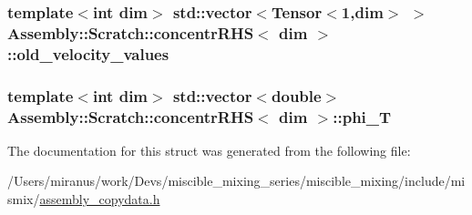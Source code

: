 \subsubsection[{old\+\_\+velocity\+\_\+values}]{\setlength{\rightskip}{0pt plus 5cm}template$<$int dim$>$ std\+::vector$<$Tensor$<$1,dim$>$ $>$ {\bf Assembly\+::\+Scratch\+::concentr\+R\+H\+S}$<$ dim $>$\+::old\+\_\+velocity\+\_\+values}\label{struct_assembly_1_1_scratch_1_1concentr_r_h_s_a387df4b1d77c791fa36096d021da90b0}
\hypertarget{struct_assembly_1_1_scratch_1_1concentr_r_h_s_acba65db7ab7aece30027901e3b0f030a}{}
\subsubsection[{phi\+\_\+\+T}]{\setlength{\rightskip}{0pt plus 5cm}template$<$int dim$>$ std\+::vector$<$double$>$ {\bf Assembly\+::\+Scratch\+::concentr\+R\+H\+S}$<$ dim $>$\+::phi\+\_\+\+T}\label{struct_assembly_1_1_scratch_1_1concentr_r_h_s_acba65db7ab7aece30027901e3b0f030a}


The documentation for this struct was generated from the following file\+:\begin{DoxyCompactItemize}
\item 
/\+Users/miranus/work/\+Devs/miscible\+\_\+mixing\+\_\+series/miscible\+\_\+mixing/include/mismix/\hyperlink{assembly__copydata_8h}{assembly\+\_\+copydata.\+h}\end{DoxyCompactItemize}
